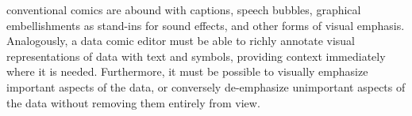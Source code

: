 conventional comics are abound with captions, speech bubbles, graphical embellishments as stand-ins for sound effects, and other forms of visual emphasis. 
Analogously, a data comic editor must be able to richly annotate visual representations of data with text and symbols, providing context immediately where it is needed. 
Furthermore, it must be possible to visually emphasize important aspects of the data, or conversely de-emphasize unimportant aspects of the data without removing them entirely from view. 











